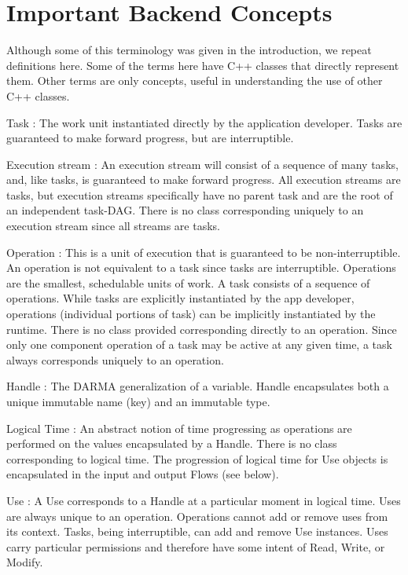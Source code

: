 \section{Important Backend Concepts}
Although some of this terminology was given in the introduction, we repeat definitions here.
Some of the terms here have C++ classes that directly represent them.
Other terms are only concepts, useful in understanding the use of other C++ classes.
\begin{compactdesc}
\item [Task]: The work unit instantiated directly by the application developer. 
Tasks are guaranteed to make forward progress, but are interruptible.
\item [Execution stream]: An execution stream will consist of a sequence of many tasks, and, like tasks, is guaranteed to make forward progress.
All execution streams are tasks, but execution streams specifically have no parent task and are the root of an independent task-DAG.
There is no class corresponding uniquely to an execution stream since all streams are tasks.
\item [Operation]: This is a unit of execution that is guaranteed to be non-interruptible. 
An operation is not equivalent to a task since tasks are interruptible.  
Operations are the smallest, schedulable units of work.  
A task consists of a sequence of operations.
While tasks are explicitly instantiated by the app developer, operations (individual portions of task) can be implicitly instantiated by the runtime.
There is no class provided corresponding directly to an operation.
Since only one component operation of a task may be active at any given time, a task always corresponds uniquely to an operation.
\item [Handle]: The DARMA generalization of a variable. Handle encapsulates both a unique immutable name (key) and an immutable type. 
\item [Logical Time]: An abstract notion of time progressing as operations are performed on the values encapsulated by a Handle.
There is no class corresponding to logical time. 
The progression of logical time for Use objects is encapsulated in the input and output Flows (see below).
\item [Use]: A Use corresponds to a Handle at a particular moment in logical time. 
Uses are always unique to an operation.
Operations cannot add or remove uses from its context.
Tasks, being interruptible, can add and remove Use instances.
Uses carry particular permissions and therefore have some intent of Read, Write, or Modify.

\end{compactdesc}
